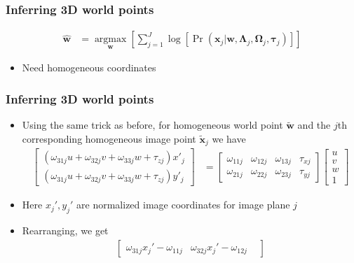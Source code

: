 \documentclass{beamer}
\begin{document}
\begin{frame}
  \frametitle{Inferring 3D world points}
  \begin{align*}
    \mathbf{\hat{w}} &=
    \underset{\mathbf{w}}
    {\operatorname{argmax}} \left[
      \sum_{j=1}^J \log{\left[
    \Pr(\mathbf{x}_j|\mathbf{w},\boldsymbol{\Lambda}_j,\boldsymbol{\Omega}_j,
    \bm{\tau}_j)
      \right]}
  \right]
  \end{align*}
  \begin{itemize}
    \item<2-> Need homogeneous coordinates
  \end{itemize}
\end{frame}

\begin{frame}
  \frametitle{Inferring 3D world points}
  \begin{itemize}[<+->]
    \item Using the same trick as before, for homogeneous world point
      $\mathbf{\tilde{w}}$ and the $j$th corresponding homogeneous image point
      $\mathbf{\tilde{x}}_j$ we have
      {\small
          \begin{align*}
          \begin{bmatrix}
            (\omega_{31j} u+\omega_{32j} v+\omega_{33j} w+\tau_{zj})x'_j \\
            (\omega_{31j} u+\omega_{32j} v+\omega_{33j} w+\tau_{zj})y'_j
          \end{bmatrix} &=
            \begin{bmatrix}
              \omega_{11j} & \omega_{12j} & \omega_{13j} & \tau_{xj} \\
              \omega_{21j} & \omega_{22j} & \omega_{23j} & \tau_{yj}
            \end{bmatrix}
            \begin{bmatrix}
              u \\ v \\ w \\ 1
            \end{bmatrix}
        \end{align*}
      }
    \item Here $x_j',y_j'$ are normalized image coordinates for image plane
      $j$
      \item Rearranging, we get
        {\small
        \begin{align*}
          \begin{bmatrix}
            \omega_{31j}x_j'-\omega_{11j} &
            \omega_{32j}x_j'-\omega_{12j} &

\end{bmatrix}
\end{align*}}
\end{itemize}
\end{frame}
\end{document}
